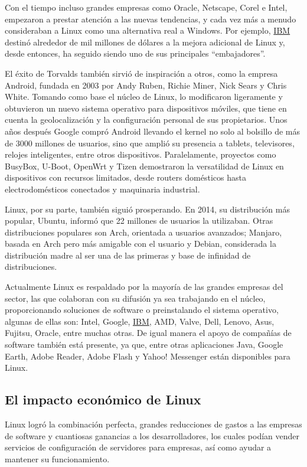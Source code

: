 \documentclass[a4paper,12pt]{article}
\begin{document}
Con el tiempo incluso grandes empresas como Oracle, Netscape, Corel e Intel,
empezaron a prestar atención a las nuevas tendencias, y cada vez más a menudo
consideraban a Linux como una alternativa real a Windows. Por ejemplo, \hyperref[ibm]{IBM}
destinó alrededor de mil millones de dólares a la mejora adicional de Linux y,
desde entonces, ha seguido siendo uno de sus principales “embajadores”.

El éxito de Torvalds también sirvió de inspiración a otros, como la empresa
Android, fundada en 2003 por Andy Ruben, Richie Miner, Nick Sears y Chris White.
Tomando como base el núcleo de Linux, lo modificaron ligeramente y obtuvieron un
nuevo sistema operativo para dispositivos móviles, que tiene en cuenta la
geolocalización y la configuración personal de sus propietarios. Unos años 
después Google compró Android llevando el kernel no solo al bolsillo de más de
3000 millones de usuarios, sino que amplió su presencia a tablets, televisores,
relojes inteligentes, entre otros dispositivos. Paralelamente, proyectos como
BusyBox, U-Boot, OpenWrt y Tizen demostraron la versatilidad de Linux en
dispositivos con recursos limitados, desde routers domésticos hasta 
electrodomésticos conectados y maquinaria industrial.

Linux, por su parte, también siguió prosperando. En 2014, su distribución más
popular, Ubuntu, informó que 22 millones de usuarios la utilizaban. Otras
distribuciones populares son Arch, orientada a usuarios avanzados; Manjaro,
basada en Arch pero más amigable con el usuario y Debian, considerada la 
distribución madre al ser una de las primeras y base de infinidad de
distribuciones. 

Actualmente Linux es respaldado por la mayoría de las grandes empresas del
sector, las que colaboran con su difusión ya sea trabajando en el núcleo,
proporcionando soluciones de software o preinstalando el sistema operativo,
algunas de ellas son: Intel, Google, \hyperref[ibm]{IBM}, AMD, Valve, Dell, Lenovo, Asus,
Fujitsu, Oracle, entre muchas otras. De igual manera el apoyo de compañías de
software también está presente, ya que, entre otras aplicaciones Java, Google
Earth, Adobe Reader, Adobe Flash y Yahoo! Messenger están disponibles para
Linux.  \subsection{El impacto económico de Linux}

Linux logró la combinación perfecta, grandes reducciones de gastos a las
empresas de software y cuantiosas ganancias a los desarrolladores, los cuales
podían vender servicios de configuración de servidores para empresas, así como
ayudar a mantener su funcionamiento. 
\end{document}
